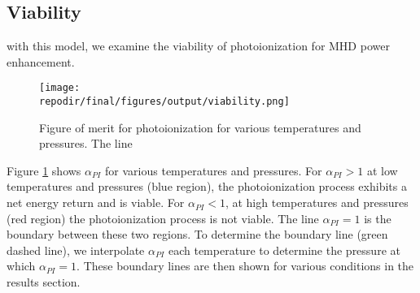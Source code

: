 \subsection{Viability}

with this model, we examine the viability of photoionization for MHD power enhancement. 


\begin{figure}[h]
    \centering
    \texttt{[image: \\repodir/final/figures/output/viability.png]} 
    \caption{Figure of merit for photoionization for various temperatures and pressures. The line}   
    \label{fig:viability_alpha}
\end{figure}

Figure \ref{fig:viability_alpha} shows $\alpha_{PI}$ for various temperatures and pressures.  For $\alpha_{PI} > 1$ at low temperatures and pressures (blue region), the photoionization process exhibits a net energy return and is viable. For $\alpha_{PI} < 1$, at high temperatures and pressures (red region) the photoionization process is not viable. The line $\alpha_{PI} = 1$ is the boundary between these two regions. To determine the boundary line (green dashed  line), we interpolate $\alpha_{PI}$ each temperature to determine the pressure at which $\alpha_{PI} = 1$. These boundary lines are then shown for various conditions in the results section.

